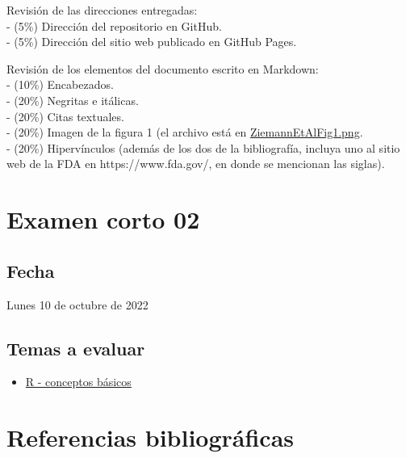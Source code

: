 \documentclass[
  letterpaper,
  DIV=11,
  numbers=noendperiod]{scrreprt}
\providecommand{\tightlist}{%
  \setlength{\itemsep}{0pt}\setlength{\parskip}{0pt}}\usepackage{longtable,booktabs,array}
\begin{document}
Revisión de las direcciones entregadas:\\
- (5\%) Dirección del repositorio en GitHub.\\
- (5\%) Dirección del sitio web publicado en GitHub Pages.

Revisión de los elementos del documento escrito en Markdown:\\
- (10\%) Encabezados.\\
- (20\%) Negritas e itálicas.\\
- (20\%) Citas textuales.\\
- (20\%) Imagen de la figura 1 (el archivo está en
\href{img/ZiemannEtAlFig1.png}{ZiemannEtAlFig1.png}.\\
- (20\%) Hipervínculos (además de los dos de la bibliografía, incluya
uno al sitio web de la FDA en https://www.fda.gov/, en donde se
mencionan las siglas).

\hypertarget{examen-corto-02}{%
\chapter*{Examen corto 02}\label{examen-corto-02}}

\hypertarget{fecha-1}{%
\section*{Fecha}\label{fecha-1}}

Lunes 10 de octubre de 2022

\hypertarget{temas-a-evaluar-1}{%
\section*{Temas a evaluar}\label{temas-a-evaluar-1}}

\begin{itemize}
\tightlist
\item
  \href{https://pf0953-programacionr.github.io/2022-ii/05-r-conceptos_basicos.html}{R
  - conceptos básicos}
\end{itemize}


\hypertarget{referencias-bibliogruxe1ficas}{%
\chapter*{Referencias
bibliográficas}\label{referencias-bibliogruxe1ficas}}
\end{document}
